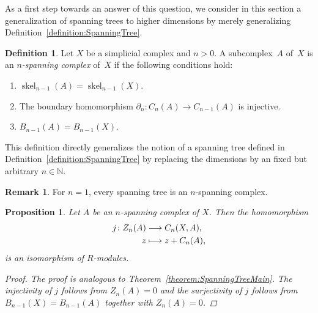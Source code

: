 \documentclass[oneside]{amsart}
\newtheorem{proposition}[theorem]{Proposition}
\theoremstyle{definition}
\newtheorem{definition}[theorem]{Definition}
\newtheorem{remark}[theorem]{Remark}
\DeclareMathOperator\skel{skel}
\begin{document}
As a first step towards an answer of this question, we consider in this section a generalization of spanning trees to higher dimensions by merely generalizing Definition~\ref{definition:SpanningTree}.
\begin{definition}%
    \label{definition:SpanningSubcomplex}
    Let $X$ be a simplicial complex and $n > 0$.
    A subcomplex~$A$ of~$X$ is an \emph{$n$-spanning complex} of~$X$ if the following conditions hold:
    \begin{enumerate}[label=(\roman*)]
        \item\label{definition:SpanningSubcomplex:c1} $\skel_{n-1}(A) = \skel_{n-1}(X)$.
        \item\label{definition:SpanningSubcomplex:c2} The boundary homomorphism $\partial_n\colon C_n(A) \to C_{n-1}(A)$ is injective.
        \item\label{definition:SpanningSubcomplex:c3} $B_{n-1}(A) = B_{n-1}(X)$.
    \end{enumerate}
\end{definition}

This definition directly generalizes the notion of a spanning tree defined in Definition~\ref{definition:SpanningTree} by replacing the dimensions by an fixed but arbitrary $n \in \mathbb N$.

\begin{remark}
    For $n = 1$, every spanning tree is an $n$-spanning complex.
\end{remark}

\begin{proposition}%
    \label{proposition:NSSMain}
    Let $A$ be an $n$-spanning complex of $X$.
    Then the homomorphism
    \begin{align*}
        j\colon Z_n(A) &\longrightarrow C_n(X, A) \text, \\
        z &\longmapsto z + C_n(A) \text,
    \end{align*}
    is an isomorphism of $R$-modules.

    \begin{proof}
        The proof is analogous to Theorem~\ref{theorem:SpanningTreeMain}.
        The injectivity of $j$ follows from $Z_n(A) = 0$ and the surjectivity of $j$ follows from $B_{n-1}(X) = B_{n-1}(A)$ together with $Z_n(A) = 0$.
    \end{proof}    
\end{proposition}
\end{document}
